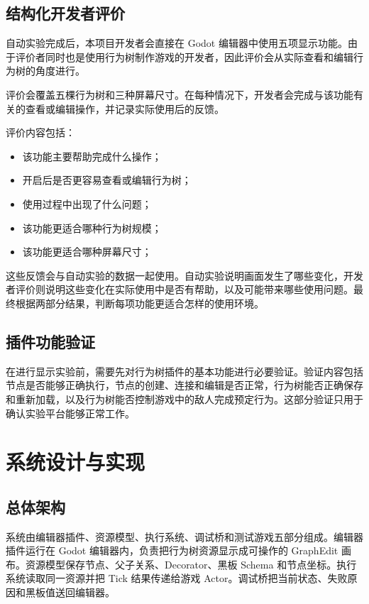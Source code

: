 \documentclass[11pt,a4paper,oneside,extrafontsizes]{memoir}
\begin{document}
\section{结构化开发者评价}

自动实验完成后，本项目开发者会直接在 Godot 编辑器中使用五项显示功能。由于评价者同时也是使用行为树制作游戏的开发者，因此评价会从实际查看和编辑行为树的角度进行。

评价会覆盖五棵行为树和三种屏幕尺寸。在每种情况下，开发者会完成与该功能有关的查看或编辑操作，并记录实际使用后的反馈。

评价内容包括：

\begin{itemize}[leftmargin=*]
\item 该功能主要帮助完成什么操作；
\item 开启后是否更容易查看或编辑行为树；
\item 使用过程中出现了什么问题；
\item 该功能更适合哪种行为树规模；
\item 该功能更适合哪种屏幕尺寸；
\end{itemize}

这些反馈会与自动实验的数据一起使用。自动实验说明画面发生了哪些变化，开发者评价则说明这些变化在实际使用中是否有帮助，以及可能带来哪些使用问题。最终根据两部分结果，判断每项功能更适合怎样的使用环境。

\section{插件功能验证}

在进行显示实验前，需要先对行为树插件的基本功能进行必要验证。验证内容包括节点是否能够正确执行，节点的创建、连接和编辑是否正常，行为树能否正确保存和重新加载，以及行为树能否控制游戏中的敌人完成预定行为。这部分验证只用于确认实验平台能够正常工作。

\chapter{系统设计与实现}

\section{总体架构}

系统由编辑器插件、资源模型、执行系统、调试桥和测试游戏五部分组成。编辑器插件运行在 Godot 编辑器内，负责把行为树资源显示成可操作的 GraphEdit 画布。资源模型保存节点、父子关系、Decorator、黑板 Schema 和节点坐标。执行系统读取同一资源并把 Tick 结果传递给游戏 Actor。调试桥把当前状态、失败原因和黑板值送回编辑器。
\end{document}
